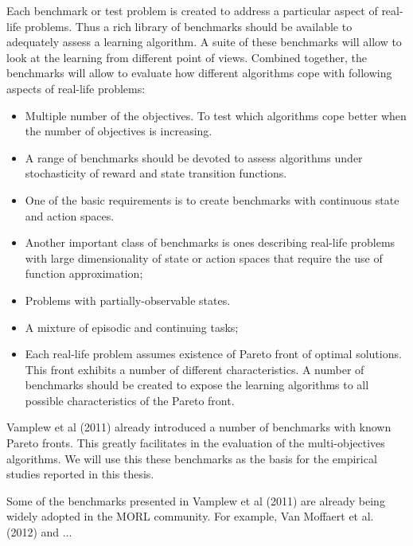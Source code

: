 {{Each benchmark or test problem is created to address a particular aspect of real-life problems. Thus a rich library of benchmarks should be available to adequately assess a learning algorithm. A suite of these benchmarks will allow to look at the learning from different point of views. Combined together, the benchmarks will allow to evaluate how different algorithms cope with following aspects of real-life problems:

\begin{itemize}

\item Multiple number of the objectives. To test which algorithms cope better when the number of objectives is increasing.

\item A range of benchmarks should be devoted to assess algorithms under stochasticity of reward and state transition functions.

\item One of the basic requirements is to create benchmarks with continuous state and action spaces.

\item Another important class of benchmarks is ones describing real-life problems with large dimensionality of state or action spaces that require the use of function approximation;

\item Problems with partially-observable states.

\item A mixture of episodic and continuing tasks;

\item Each real-life problem assumes existence of Pareto front of optimal solutions. This front exhibits a number of different characteristics. A number of benchmarks should be created to expose the learning algorithms to all possible characteristics of the Pareto front.

\end{itemize}

Vamplew et al (2011)\nocite{vamplew2011empirical} already introduced a number of benchmarks with known Pareto fronts. This greatly facilitates in the evaluation of the multi-objectives algorithms. We will use this these benchmarks as the basis for the empirical studies reported in this thesis.

Some of the benchmarks presented in Vamplew et al (2011)\nocite{vamplew2011empirical} are already being widely adopted in the MORL community. For example, Van Moffaert et al. (2012)\nocite{vamplew2011empirical} and ...

}}
